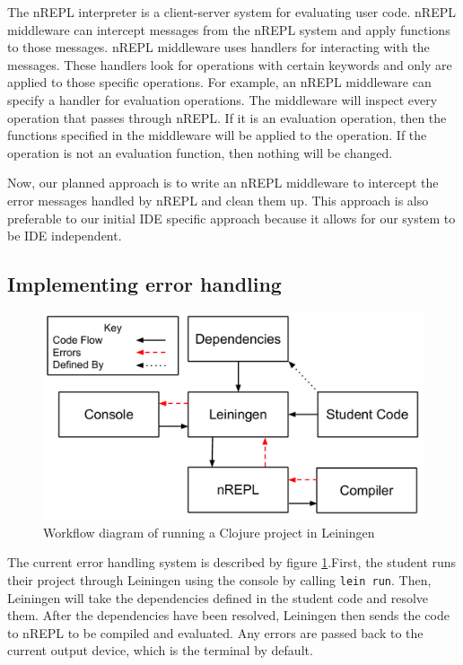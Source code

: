 \documentclass[12pt]{article}
\newcommand{\comment}[1]{{\bf \tt  {#1}}}
\newcommand{\emcomment}[1]{\textcolor{ForestGreen}{\comment{Elena: {#1}}}}
\newcommand{\hfcomment}[1]{\textcolor{Teal}{\comment{Henry: {#1}}}}
\begin{document}
The nREPL interpreter is a client-server system for evaluating user code. nREPL middleware can intercept messages from the nREPL system and apply functions to those messages. nREPL middleware uses handlers for interacting with the messages. These handlers look for operations with certain keywords and only are applied to those specific operations. For example, an nREPL middleware can specify a handler for evaluation operations. The middleware will inspect every operation that passes through nREPL. If it is an evaluation operation, then the functions specified in the middleware will be applied to the operation. If the operation is not an evaluation function, then nothing will be changed.

Now, our planned approach is to write an nREPL middleware to intercept the error messages handled by nREPL and clean them up. 
This approach is also preferable to our initial IDE specific approach because it allows for our system to be IDE independent. 

\subsection{Implementing error handling}

\begin{figure}[h]
 \includegraphics[width=12cm]{CurrentErrorHandling.pdf}
 \centering
 \caption{Workflow diagram of running a Clojure project in Leiningen}
 \label{fig:CurrentError}
\end{figure}


The current error handling system is described by figure \ref{fig:CurrentError}.First, the student runs their project through Leiningen using the console by calling \texttt{lein run}. Then, Leiningen will take the dependencies defined in the student code and resolve them. After the dependencies have been resolved, Leiningen then sends the code to nREPL to be compiled and evaluated. Any errors are passed back to the current output device, which is the terminal by default. 
\end{document}
